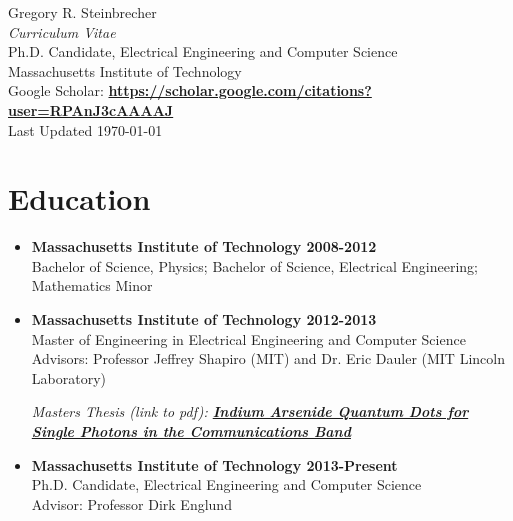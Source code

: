 \documentclass[letterpaper,12pt]{article}
\begin{document}
\begin{center}
  {\huge Gregory R. Steinbrecher}\\
  \vspace{2mm}
{\large \emph{Curriculum Vitae}}\\
\vspace{2mm}
{\normalsize Ph.D. Candidate, Electrical Engineering and Computer Science\\
Massachusetts Institute of Technology}\\

{\small Google Scholar: \href{https://scholar.google.com/citations?user=RPAnJ3cAAAAJ}{\textbf{https://scholar.google.com/citations?user=RPAnJ3cAAAAJ}}}\\
\vspace{5mm}
{\small Last Updated \today}\\
\end{center}

\section{Education}

\begin{itemize}

\item \textbf{Massachusetts Institute of Technology 2008-2012}\\
Bachelor of Science, Physics; Bachelor of Science, Electrical Engineering; Mathematics Minor

\item \textbf{Massachusetts Institute of Technology 2012-2013}\\
Master of Engineering in Electrical Engineering and Computer Science\\
Advisors: Professor Jeffrey Shapiro (MIT) and Dr. Eric Dauler (MIT Lincoln Laboratory)

\vspace{0.5em}

{\small \emph{Masters Thesis (link to pdf): \href{http://web.mit.edu/gstein/www/steinbrecher-meng-thesis.pdf}{\textbf{Indium Arsenide Quantum Dots for Single Photons in the Communications Band}}}}

\item \textbf{Massachusetts Institute of Technology 2013-Present}\\
Ph.D. Candidate, Electrical Engineering and Computer Science\\
Advisor: Professor Dirk Englund

\end{itemize}
\end{document}
